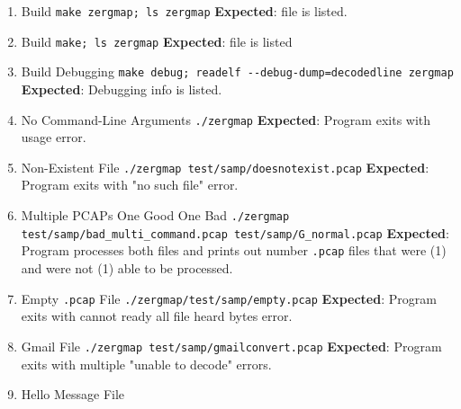 \documentclass[12pt]{article}
\begin{document}
\hspace{8pt}
\begin{enumerate}
    \item Build
    \newline
        \lstinline|make zergmap; ls zergmap|
        \newline
            \textbf{Expected}: file is listed.
    \item Build
    \newline
        \lstinline|make; ls zergmap|
        \newline
            \textbf{Expected}: file is listed
    \item Build Debugging
    \newline
        \lstinline|make debug; readelf --debug-dump=decodedline zergmap|
        \newline
            \textbf{Expected}: Debugging info is listed.
    \item No Command-Line Arguments
    \newline
        \lstinline|./zergmap|
        \newline
            \textbf{Expected}: Program exits with usage error.
    \item Non-Existent File
    \newline
        \lstinline|./zergmap test/samp/doesnotexist.pcap|
        \newline
            \textbf{Expected}: Program exits with "no such file" error.
        \item Multiple PCAPs One Good One Bad
    \newline
        \lstinline|./zergmap test/samp/bad_multi_command.pcap test/samp/G_normal.pcap|
        \newline
            \textbf{Expected}: Program processes both files and prints out number \lstinline|.pcap| files that were (1) and were not (1) able to be processed.
    \item Empty \lstinline|.pcap| File
    \newline
        \lstinline|./zergmap/test/samp/empty.pcap|
        \newline
            \textbf{Expected}: Program exits with cannot ready all file heard bytes error.
    \item Gmail File
    \newline
        \lstinline|./zergmap test/samp/gmailconvert.pcap|
        \newline
            \textbf{Expected}: Program exits with multiple "unable to decode" errors.
    \item Hello Message File

\end{enumerate}
\end{document}

